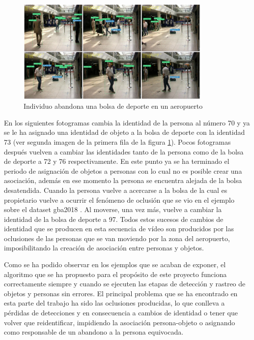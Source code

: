 \begin{figure}[ht]
\centering
\includegraphics[width=0.85\textwidth]{img/chapters/resultados/abandono/4.png}
\caption{\label{fig:results4}Individuo abandona una bolsa de deporte en un aeropuerto \cite{pets2007-dataset}}
\end{figure}

En los siguientes fotogramas cambia la identidad de la persona al número 70 y ya se le ha asignado una identidad de objeto a la bolsa de deporte con la identidad 73 (ver segunda imagen de la primera fila de la figura \ref{fig:results4}). Pocos fotogramas después vuelven a cambiar las identidades tanto de la persona como de la bolsa de deporte a 72 y 76 respectivamente. En este punto ya se ha terminado el periodo de asignación de objetos a personas con lo cual no es posible crear una asociación, además en ese momento la persona se encuentra alejada de la bolsa desatendida. Cuando la persona vuelve a acercarse a la bolsa de la cual es propietario vuelve a ocurrir el fenómeno de oclusión que se vio en el ejemplo sobre el dataset \gls{gba2018} \cite{gba-dataset}. Al moverse, una vez más, vuelve a cambiar la identidad de la bolsa de deporte a 97. Todos estos sucesos de cambios de identidad que se producen en esta secuencia de vídeo son producidos por las oclusiones de las personas que se van moviendo por la zona del aeropuerto, imposibilitando la creación de asociación entre personas y objetos.

Como se ha podido observar en los ejemplos que se acaban de exponer, el algoritmo que se ha propuesto para el propósito de este proyecto funciona correctamente siempre y cuando se ejecuten las etapas de detección y rastreo de objetos y personas sin errores. El principal problema que se ha encontrado en esta parte del trabajo ha sido las oclusiones producidas, lo que conlleva a pérdidas de detecciones y en consecuencia a cambios de identidad o tener que volver que reidentificar, impidiendo la asociación persona-objeto o asignando como responsable de un abandono a la persona equivocada.

